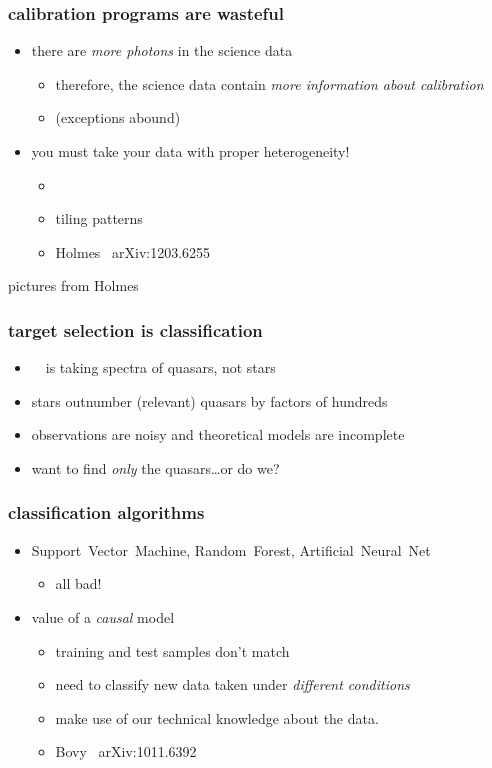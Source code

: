 \documentclass[pdftex]{beamer}
\begin{document}
\begin{frame}
  \frametitle{calibration programs are wasteful}
  \begin{itemize}
  \item there are \emph{more photons} in the science data
    \begin{itemize}
    \item therefore, the science data contain \emph{more information about calibration}
    \item (exceptions abound)
    \end{itemize}
  \item you must take your data with proper heterogeneity!
    \begin{itemize}
    \item \kepler
    \item tiling patterns
    \item Holmes \etal\ arXiv:1203.6255
    \end{itemize}
  \end{itemize}
\end{frame}

\begin{frame}
pictures from Holmes
\end{frame}

\begin{frame}
  \frametitle{target selection is classification}
  \begin{itemize}
  \item \sdssiii\ \boss\ is taking spectra of quasars, not stars
  \item stars outnumber (relevant) quasars by factors of hundreds
  \item observations are noisy and theoretical models are incomplete
  \item want to find \emph{only} the quasars\ldots or do we?
  \end{itemize}
\end{frame}

\begin{frame}
  \frametitle{classification algorithms}
  \begin{itemize}
  \item Support~Vector~Machine, Random~Forest, Artificial~Neural~Net
    \begin{itemize}
    \item all bad!
    \end{itemize}
  \item value of a \emph{causal} model
    \begin{itemize}
    \item training and test samples don't match
    \item need to classify new data taken under \emph{different conditions}
    \item make use of our technical knowledge about the data.
    \item Bovy \etal\ arXiv:1011.6392
    \end{itemize}
  \end{itemize}
\end{frame}
\end{document}
